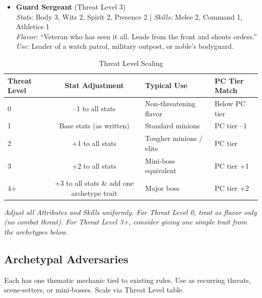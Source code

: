 \begin{itemize}
    \item \textbf{Guard Sergeant} (Threat Level 3) \\
    \textit{Stats:} Body 3, Wits 2, Spirit 2, Presence 2 \quad | \quad \textit{Skills:} Melee 2, Command 1, Athletics 1 \\
    \textit{Flavor:} ``Veteran who has seen it all. Leads from the front and shouts orders.'' \\
    \textit{Use:} Leader of a watch patrol, military outpost, or noble's bodyguard.
\end{itemize}

\begin{table}[htbp]
\centering
\caption{Threat Level Scaling}
\label{tab:threat-scaling}
\begin{tabular}{lcll}
\toprule
\textbf{Threat Level} & \textbf{Stat Adjustment} & \textbf{Typical Use} & \textbf{PC Tier Match} \\
\midrule
0 & --1 to all stats & Non‑threatening flavor & Below PC tier \\
1 & Base stats (as written) & Standard minions & PC tier --1 \\
2 & +1 to all stats & Tougher minions / elite & PC tier \\
3 & +2 to all stats & Mini‑boss equivalent & PC tier +1 \\
4+ & +3 to all stats \& add one archetype trait & Major boss & PC tier +2 \\
\bottomrule
\end{tabular}
\end{table}
\par\smallskip\textit{Adjust all Attributes and Skills uniformly. For Threat Level 0, treat as flavor only (no combat threat). For Threat Level 3+, consider giving one simple trait from the archetypes below.}

\subsection{Archetypal Adversaries}
\label{subsec:archetypal-adversaries}
Each has one thematic mechanic tied to existing rules. Use as recurring threats, scene‑setters, or mini‑bosses. Scale via Threat Level table.

